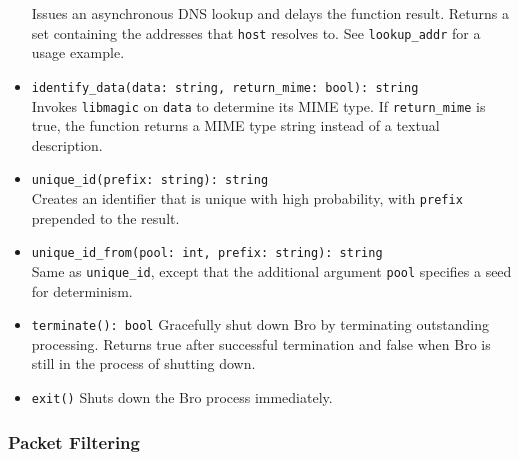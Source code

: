 \documentclass[10pt,landscape]{article}
\begin{document}
\begin{multicols*}{2}
\begin{itemize}
    Issues an asynchronous DNS lookup and delays the function result.
    Returns a set containing the addresses that \verb|host| resolves to.
    See \verb|lookup_addr| for a usage example.
  \item \verb|identify_data(data: string, return_mime: bool): string|\\
    Invokes \texttt{libmagic} on \verb|data| to determine its MIME type. If
    \verb|return_mime| is true, the function returns a MIME type string instead
    of a textual description.
  \item \verb|unique_id(prefix: string): string|\\
    Creates an identifier that is unique with high probability, with
    \verb|prefix| prepended to the result.
  \item \verb|unique_id_from(pool: int, prefix: string): string|\\
    Same as \verb|unique_id|, except that the additional argument \verb|pool|
    specifies a seed for determinism.
  \item \verb|terminate(): bool|
    Gracefully shut down Bro by terminating outstanding processing. Returns
    true after successful termination and false when Bro is still in the
    process of shutting down.
  \item \verb|exit()|
    Shuts down the Bro process immediately.
\end{itemize}

\subsubsection*{Packet Filtering}


\end{multicols*}
\end{document}
